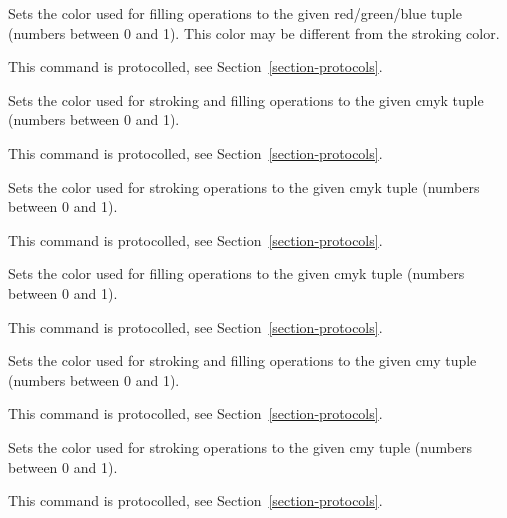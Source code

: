 \begin{command}{\pgfsys@color@rgb@fill{}}
  Sets the color used for filling operations to the given
  red/green/blue tuple (numbers between 0 and 1). This color may be
  different from the stroking color.

  This command is protocolled, see Section~\ref{section-protocols}.
\end{command}

\begin{command}{\pgfsys@color@cmyk{}}
  Sets the color used for stroking and filling operations to the given
  cmyk tuple (numbers between 0 and 1).

  This command is protocolled, see Section~\ref{section-protocols}.
\end{command}

\begin{command}{\pgfsys@color@cmyk@stroke{}}
  Sets the color used for stroking operations to the given cmyk tuple
  (numbers between 0 and 1).

  This command is protocolled, see Section~\ref{section-protocols}.
\end{command}

\begin{command}{\pgfsys@color@cmyk@fill{}}
  Sets the color used for filling operations to the given cmyk tuple
  (numbers between 0 and 1).

  This command is protocolled, see Section~\ref{section-protocols}.
\end{command}

\begin{command}{\pgfsys@color@cmy{}}
  Sets the color used for stroking and filling operations to the given
  cmy tuple (numbers between 0 and 1).

  This command is protocolled, see Section~\ref{section-protocols}.
\end{command}

\begin{command}{\pgfsys@color@cmy@stroke{}}
  Sets the color used for stroking operations to the given cmy tuple
  (numbers between 0 and 1).

  This command is protocolled, see Section~\ref{section-protocols}.
\end{command}

